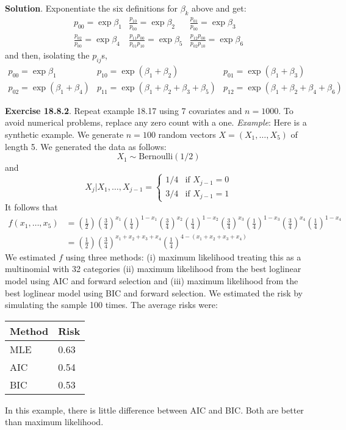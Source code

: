 \textbf{Solution}.
Exponentiate the six definitions for \(\beta_{k}\) above and get:
\[
\begin{array}{ccc}
p_{00} = \exp \beta_{1} &
\frac{p_{10}}{p_{00}} = \exp \beta_{2} &
\frac{p_{01}}{p_{00}} = \exp \beta_{3} \\
\frac{p_{02}}{p_{00}} = \exp \beta_{4} &
\frac{p_{11}p_{00}}{p_{01}p_{10}} = \exp \beta_{5} &
\frac{p_{12}p_{00}}{p_{02}p_{10}} = \exp \beta_{6}
\end{array}
\]
and then, isolating the \(p_{ij}\)s,
\[
\begin{array}{ccc}
p_{00} = \exp \beta_{1} &
p_{10} = \exp \left( \beta_{1} + \beta_{2} \right) &
p_{01} = \exp \left( \beta_{1} + \beta_{3} \right) \\
p_{02} = \exp \left( \beta_{1} + \beta_{4} \right) &
p_{11} = \exp \left( \beta_{1} + \beta_{2} + \beta_{3} + \beta_{5} \right) &
p_{12} = \exp \left( \beta_{1} + \beta_{2} + \beta_{4} + \beta_{6} \right)
\end{array}
\]

\textbf{Exercise 18.8.2}. Repeat example 18.17 using 7 covariates and
\(n = 1000\). To avoid numerical problems, replace any zero count with a
one.
\emph{Example}: Here is a synthetic example. We generate \(n = 100\)
random vectors \(X = (X_{1}, \dots, X_{5})\) of length 5. We generated the
data as follows:
\[
X_{1} \sim \text{Bernoulli}(1/2)
\]
and
\[
X_{j} | X_{1}, \dots, X_{j-1} = \begin{cases}
1/4 & \text{if } X_{j-1} = 0 \\
3/4 & \text{if } X_{j-1} = 1
\end{cases}
\]
It follows that
\begin{align*}
f(x_{1}, \dots, x_{5}) &= 
\left( \frac{1}{2} \right) \left( \frac{3}{4} \right)^{x_{1}} \left( \frac{1}{4} \right)^{1 - x_{1}} \left( \frac{3}{4} \right)^{x_{2}} \left( \frac{1}{4} \right)^{1 - x_{2}} \left( \frac{3}{4} \right)^{x_{3}} \left( \frac{1}{4} \right)^{1 - x_{3}} \left( \frac{3}{4} \right)^{x_{4}} \left( \frac{1}{4} \right)^{1 - x_{4}} \\
&= \left( \frac{1}{2} \right) \left( \frac{3}{4} \right)^{x_{1} + x_{2} + x_{3} + x_{4}} \left( \frac{1}{4} \right)^{4 - (x_{1} + x_{2} + x_{3} + x_{4})} 
\end{align*}
We estimated \(f\) using three methods: (i) maximum likelihood treating
this as a multinomial with 32 categories (ii) maximum likelihood from
the best loglinear model using AIC and forward selection and (iii)
maximum likelihood from the best loglinear model using BIC and forward
selection. We estimated the risk by simulating the sample 100 times. The
average risks were:
\begin{table}[H]
\centering
\begin{tabular}{@{}ll@{}}
\toprule
Method & Risk \\
\midrule
MLE & 0.63 \\
AIC & 0.54 \\
BIC & 0.53 \\
\bottomrule
\end{tabular}
\end{table}
In this example, there is little difference between AIC and BIC. Both
are better than maximum likelihood.


